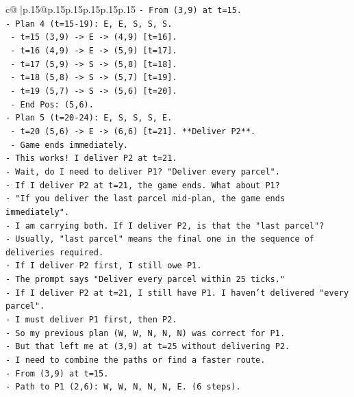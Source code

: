 \documentclass{article}
\begin{document}
{\begin{supertabular}{c@{$\;$}|p{.15\linewidth}@{}p{.15\linewidth}p{.15\linewidth}p{.15\linewidth}p{.15\linewidth}p{.15\linewidth}}
{{{\texttt{{-} From (3,9) at t=15.} \\
\texttt{{-} Plan 4 (t=15{-}19): E, E, S, S, S.} \\
\texttt{  {-} t=15 (3,9) {-}> E {-}> (4,9) {[}t=16{]}.} \\
\texttt{  {-} t=16 (4,9) {-}> E {-}> (5,9) {[}t=17{]}.} \\
\texttt{  {-} t=17 (5,9) {-}> S {-}> (5,8) {[}t=18{]}.} \\
\texttt{  {-} t=18 (5,8) {-}> S {-}> (5,7) {[}t=19{]}.} \\
\texttt{  {-} t=19 (5,7) {-}> S {-}> (5,6) {[}t=20{]}.} \\
\texttt{  {-} End Pos: (5,6).} \\
\texttt{{-} Plan 5 (t=20{-}24): E, S, S, S, E.} \\
\texttt{  {-} t=20 (5,6) {-}> E {-}> (6,6) {[}t=21{]}. **Deliver P2**.} \\
\texttt{  {-} Game ends immediately.} \\
\texttt{{-} This works! I deliver P2 at t=21.} \\
\texttt{{-} Wait, do I need to deliver P1? "Deliver every parcel".} \\
\texttt{{-} If I deliver P2 at t=21, the game ends. What about P1?} \\
\texttt{{-} "If you deliver the last parcel mid{-}plan, the game ends immediately".} \\
\texttt{{-} I am carrying both. If I deliver P2, is that the "last parcel"?} \\
\texttt{{-} Usually, "last parcel" means the final one in the sequence of deliveries required.} \\
\texttt{{-} If I deliver P2 first, I still owe P1.} \\
\texttt{{-} The prompt says "Deliver every parcel within 25 ticks."} \\
\texttt{{-} If I deliver P2 at t=21, I still have P1. I haven't delivered "every parcel".} \\
\texttt{{-} I must deliver P1 first, then P2.} \\
\texttt{{-} So my previous plan (W, W, N, N, N) was correct for P1.} \\
\texttt{{-} But that left me at (3,9) at t=25 without delivering P2.} \\
\texttt{{-} I need to combine the paths or find a faster route.} \\
\texttt{{-} From (3,9) at t=15.} \\
\texttt{{-} Path to P1 (2,6): W, W, N, N, N, E. (6 steps).} \\
}}}
\end{supertabular}}
\end{document}
